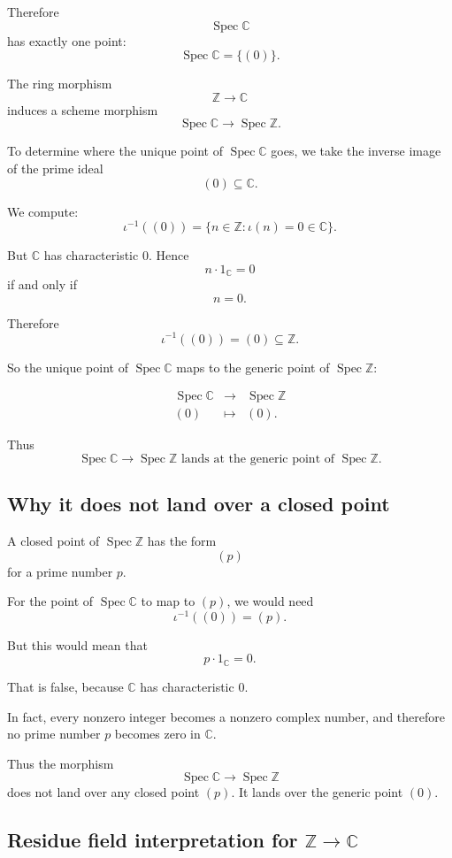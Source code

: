 \documentclass[12pt,a4paper]{article}
\DeclareMathOperator{\Spec}{Spec}
\theoremstyle{notespace}
\begin{document}
Therefore
\[
\Spec\mathbb C
\]
has exactly one point:
\[
\Spec\mathbb C=\{(0)\}.
\]

The ring morphism
\[
\mathbb Z\to \mathbb C
\]
induces a scheme morphism
\[
\Spec\mathbb C\longrightarrow \Spec\mathbb Z.
\]

To determine where the unique point of \(\Spec\mathbb C\) goes, we take the inverse image of the prime ideal
\[
(0)\subseteq \mathbb C.
\]

We compute:
\[
\iota^{-1}((0))
=
\{n\in \mathbb Z:\iota(n)=0\in \mathbb C\}.
\]

But \(\mathbb C\) has characteristic \(0\). Hence
\[
n\cdot 1_{\mathbb C}=0
\]
if and only if
\[
n=0.
\]

Therefore
\[
\iota^{-1}((0))=(0)\subseteq \mathbb Z.
\]

So the unique point of \(\Spec\mathbb C\) maps to the generic point of \(\Spec\mathbb Z\):

\[
\begin{array}{ccc}
	\Spec\mathbb C & \longrightarrow & \Spec\mathbb Z
	\\[6pt]
	(0) & \longmapsto & (0).
\end{array}
\]

Thus
\[
\boxed{
	\Spec\mathbb C\to \Spec\mathbb Z
	\text{ lands at the generic point of }\Spec\mathbb Z.
}
\]

\subsection{Why it does not land over a closed point}

A closed point of \(\Spec\mathbb Z\) has the form
\[
(p)
\]
for a prime number \(p\).

For the point of \(\Spec\mathbb C\) to map to \((p)\), we would need
\[
\iota^{-1}((0))=(p).
\]

But this would mean that
\[
p\cdot 1_{\mathbb C}=0.
\]

That is false, because \(\mathbb C\) has characteristic \(0\).

In fact, every nonzero integer becomes a nonzero complex number, and therefore no prime number \(p\) becomes zero in \(\mathbb C\).

Thus the morphism
\[
\Spec\mathbb C\to \Spec\mathbb Z
\]
does not land over any closed point \((p)\). It lands over the generic point \((0)\).

\subsection{Residue field interpretation for \texorpdfstring{\(\mathbb Z\to \mathbb C\)}{Z to C}}
\end{document}
